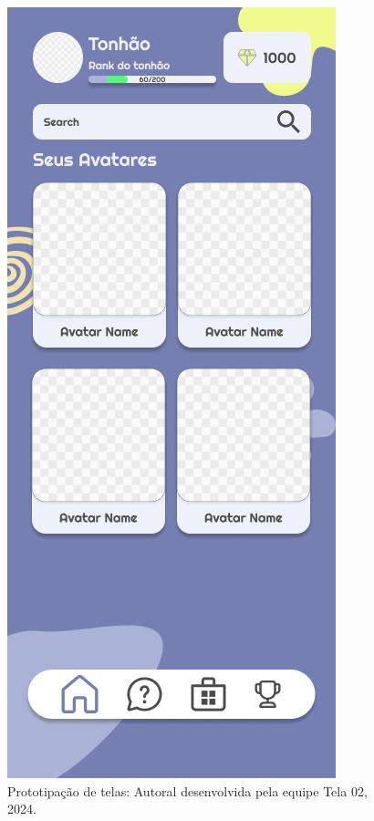 \documentclass[12pt, openany, oneside, a4paper, english, brazil]{abntex2}   %
\begin{document}
\begin{figure}
    \centering
    \includegraphics[scale=0.7]{figuras/Math.Pow App/AvatarPage.png}
    \caption{Prototipação de telas: Autoral desenvolvida pela equipe Tela 02, 2024.}
    \label{fig:nome-da-imagem}
\end{figure}
\end{document}
